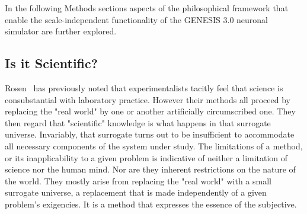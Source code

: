 \documentclass{article}
\begin{document}
In the following Methods sections aspects of the philosophical framework that enable the scale-independent functionality of the GENESIS 3.0 neuronal simulator are further explored. 

\subsection{Is it Scientific?}



Rosen~\cite{rosen96} has previously noted that experimentalists tacitly feel that science is consubstantial with laboratory practice. However their methods all proceed by replacing the "real world" by one or another artificially circumscribed one. They then regard that "scientific" knowledge is what happens in that surrogate universe. Invariably, that surrogate turns out to be insufficient to accommodate all necessary components of the system under study. The limitations of a method, or its inapplicability to a given problem is indicative of neither a limitation of science nor the human mind. Nor are they inherent restrictions on the nature of the world.  They mostly arise from replacing the "real world" with a small surrogate universe, a replacement that is made independently of a given problem's exigencies. It is a method that expresses the essence of the subjective.
\end{document}
